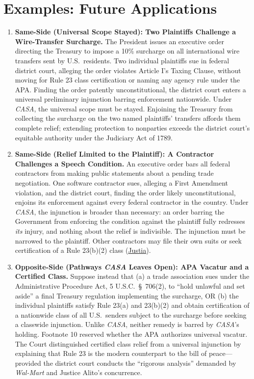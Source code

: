 \documentclass[12pt]{article}
\begin{document}
\section{Examples: Future Applications}
\begin{enumerate}

\item \textbf{Same-Side (Universal Scope Stayed): Two Plaintiffs Challenge a Wire-Transfer Surcharge.} The President issues an executive order directing the Treasury to impose a 10\% surcharge on all international wire transfers sent by U.S.\ residents. Two individual plaintiffs sue in federal district court, alleging the order violates Article I's Taxing Clause, without moving for Rule 23 class certification or naming any agency rule under the APA. Finding the order patently unconstitutional, the district court enters a universal preliminary injunction barring enforcement nationwide. Under \textit{CASA}, the universal scope must be stayed. Enjoining the Treasury from collecting the surcharge on the two named plaintiffs' transfers affords them complete relief; extending protection to nonparties exceeds the district court's equitable authority under the Judiciary Act of 1789.

\item \textbf{Same-Side (Relief Limited to the Plaintiff): A Contractor Challenges a Speech Condition.} An executive order bars all federal contractors from making public statements about a pending trade negotiation. One software contractor sues, alleging a First Amendment violation, and the district court, finding the order likely unconstitutional, enjoins its enforcement against every federal contractor in the country. Under \textit{CASA}, the injunction is broader than necessary: an order barring the Government from enforcing the condition against the plaintiff fully redresses \emph{its} injury, and nothing about the relief is indivisible. The injunction must be narrowed to the plaintiff. Other contractors may file their own suits or seek certification of a Rule 23(b)(2) class (\href{https://supreme.justia.com/cases/federal/us/606/24a884/}{Justia}).

\item \textbf{Opposite-Side (Pathways \textit{CASA} Leaves Open): APA Vacatur and a Certified Class.} Suppose instead that (a) a trade association sues under the Administrative Procedure Act, 5 U.S.C.\ \S\ 706(2), to ``hold unlawful and set aside'' a final Treasury regulation implementing the surcharge, OR (b) the individual plaintiffs satisfy Rule 23(a) and 23(b)(2) and obtain certification of a nationwide class of all U.S.\ senders subject to the surcharge before seeking a classwide injunction. Unlike \textit{CASA}, neither remedy is barred by \textit{CASA}'s holding. Footnote 10 reserved whether the APA authorizes universal vacatur. The Court distinguished certified class relief from a universal injunction by explaining that Rule 23 is the modern counterpart to the bill of peace---provided the district court conducts the ``rigorous analysis'' demanded by \textit{Wal-Mart} and Justice Alito's concurrence.


\end{enumerate}
\end{document}

